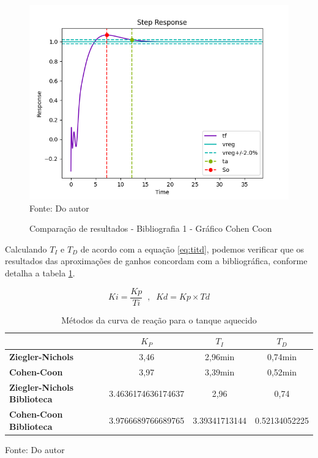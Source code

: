 \begin{figure}[H]
    \centering
    \caption{Comparação de resultados - Bibliografia 1 - Gráfico Cohen Coon}
    \includegraphics[scale=0.8]{figuras/bib_comp_1_code1_out_fig3}
    \label{fig:bib_comp_1_code1_out_fig3}
    \\
    \vspace{0cm}\hspace{0cm}\small{Fonte: Do autor}
\end{figure}

Calculando $T_I$ e $T_D$ de acordo com a equação \ref{eq:titd}, podemos verificar que os resultados das aproximações de
ganhos concordam com a bibliográfica, conforme detalha a tabela \ref{tab:bib_comp_1_pid_comp}.

\begin{equation}
    \label{eq:titd}
    Ki = \frac{Kp}{Ti} \;\; , \;\; Kd = Kp \times Td
\end{equation}

\begin{table}[h]
    \begin{center}
        \begin{tabular}{ | l | c | c | c | }
            \hline
            {}                         & {$K_P$} & {$T_I$}   & {$T_D$}   \\
            \hline
            {\textbf{Ziegler-Nichols}} & {3,46}  & {2,96min} & {0,74min} \\
            \hline
            {\textbf{Cohen-Coon}}      & {3,97}  & {3,39min} & {0,52min} \\
            \hline
            {\textbf{Ziegler-Nichols Biblioteca}} & {3.4636174636174637}  & {2,96} & {0,74} \\
            \hline
            {\textbf{Cohen-Coon Biblioteca}}      & {3.9766689766689765}  & {3.39341713144} & {0.52134052225} \\
            \hline
        \end{tabular}
        \caption{ Métodos da curva de reação para o tanque aquecido}
        \vspace{0cm}\hspace{0cm}\small{Fonte: Do autor}
        \label{tab:bib_comp_1_pid_comp}
    \end{center}
\end{table}


